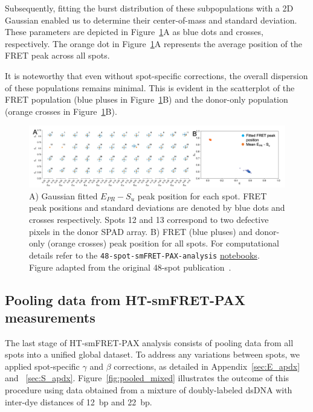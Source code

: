 Subsequently, fitting the burst distribution of these subpopulations with a 2D Gaussian enabled us to determine their center-of-mass and standard deviation. 
These parameters are depicted in Figure~\ref{fig:peak_Epr_S}A as blue dots and crosses, respectively. 
The orange dot in Figure~\ref{fig:peak_Epr_S}A represents the average position of the FRET peak across all spots. 

It is noteworthy that even without spot-specific corrections, the overall dispersion of these populations remains minimal.
This is evident in the scatterplot of the FRET population (blue pluses in Figure~\ref{fig:peak_Epr_S}B) and the donor-only population (orange crosses in Figure~\ref{fig:peak_Epr_S}B).

\begin{figure}
\centering\includegraphics[width=1.0\linewidth]{chapters/figures/Epr_Su_peaks.png} 
\caption{\label{fig:peak_Epr_S}
A) Gaussian fitted $E_{PR} - S_u$ peak position for each spot.
FRET peak positions and standard deviations are denoted by blue dots and crosses respectively. 
Spots 12 and 13 correspond to two defective pixels in the donor \ac{SPAD} array.
B) FRET (blue pluses) and donor-only (orange crosses) peak position for all spots. 
For computational details refer to the \texttt{48-spot-smFRET-PAX-analysis} 
\href{https://github.com/tritemio/48-spot-smFRET-PAX-analysis}{notebooks}.
Figure adapted from the original 48-spot publication~\cite{ingargiola_JCP_2018}.}
\end{figure}

\subsection{Pooling data from HT-smFRET-PAX measurements}
\label{sec:pooling_data}

The last stage of \ac{HT-smFRET}-PAX analysis consists of pooling data from all spots into a unified global dataset. 
To address any variations between spots, we applied spot-specific $\gamma$ and $\beta$ corrections, as detailed in Appendix~\ref{sec:E_apdx} and ~\ref{sec:S_apdx}. 
Figure~\ref{fig:pooled_mixed} illustrates the outcome of this procedure using data obtained from a mixture of doubly-labeled \ac{dsDNA} with inter-dye distances of 12~\ac{bp} and 22~\ac{bp}.

